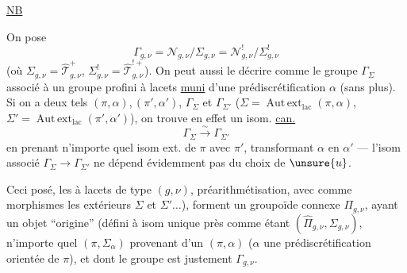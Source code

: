 
\uline{NB}

On pose 
\[
\Gamma_{g,\nu}=\mathcal N_{g,\nu}/\Sigma_{g,\nu}
=\mathcal N^{!}_{g,\nu}/\Sigma^{!}_{g,\nu}
\]
(où $\Sigma_{g,\nu}=\widehat{\mathcal T}^{+}_{g,\nu}$,
$\Sigma^{!}_{g,\nu}=\widehat{\mathcal T}^{!+}_{g,\nu}$).
On peut aussi le décrire comme le groupe $\Gamma_{\Sigma}$ associé à un
groupe  profini à lacets \inserted{$\pi$}
\uline{muni} d'une prédiscrétification 
$\alpha$ (sans plus). Si on a deux tels 
$(\pi,\alpha),(\pi',\alpha')$,  $\Gamma_{\Sigma}$ et
$\Gamma_{\Sigma'}$ ($\Sigma=\operatorname{Aut\,ext}_{\mathrm{lac}}(\pi,\alpha)$,
$\Sigma'=\operatorname{Aut\,ext}_{\mathrm{lac}}(\pi',\alpha')$), on trouve en effet un
isom. \uline{can.}
\[
\Gamma_{\Sigma}\xrightarrow{\sim}\Gamma_{\Sigma'}
\]
en prenant n'importe quel isom ext.  de $\pi$ avec $\pi'$,
transformant $\alpha$ en $\alpha'$ --- l'isom associé
$\Gamma_{\Sigma}\longrightarrow\Gamma_{\Sigma'}$ ne dépend évidemment pas du choix de
$\unsure{u}$.

Ceci posé, les 
  à lacets de type $(g,\nu)$,
 préarithmétisation,
avec comme morphismes les   extérieurs
 $\Sigma$ et $\Sigma'\ldots$),
forment un groupoïde connexe $\Pi_{g,\nu}$, ayant un objet ``origine''
(défini à isom unique près comme étant $(\widehat{\Pi}_{g,\nu},\Sigma_{g,\nu})$,
 n'importe quel $(\pi,\Sigma_{\alpha})$ provenant d'un
$(\pi,\alpha)$ ($\alpha$ une prédiscrétification orientée de $\pi$),
et dont le groupe   est justement $\Gamma_{g,\nu}$.


